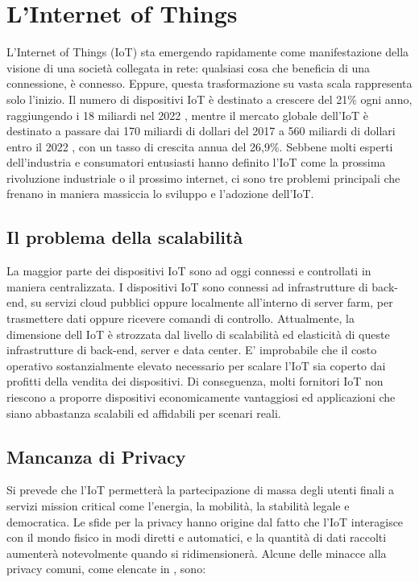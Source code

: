 \documentclass[a4paper,12pt]{article}
\begin{document}
\pagebreak

\tableofcontents

\pagebreak

\section{L'Internet of Things}
L'Internet of Things (IoT) sta emergendo rapidamente come manifestazione della visione di una società collegata in rete: qualsiasi cosa che beneficia di una connessione, è connesso. Eppure, questa trasformazione su vasta scala rappresenta solo l'inizio. Il numero di dispositivi IoT è destinato a crescere del 21\% ogni anno, raggiungendo i 18 miliardi nel 2022 \cite{c10}, mentre il mercato globale dell'IoT è destinato a passare dai 170 miliardi di dollari del 2017 a 560 miliardi di dollari entro il 2022 \cite{c15}, con un tasso di crescita annua del 26,9\%. Sebbene molti esperti dell'industria e consumatori entusiasti hanno definito l'IoT come la prossima rivoluzione industriale o il prossimo internet, ci sono tre problemi principali che frenano in maniera massiccia lo sviluppo e l'adozione dell'IoT.

\subsection{Il problema della scalabilità}
La maggior parte dei dispositivi IoT sono ad oggi connessi e controllati in maniera centralizzata. I dispositivi IoT sono connessi ad infrastrutture di back-end, su servizi cloud pubblici oppure localmente all'interno di server farm, per trasmettere dati oppure ricevere comandi di controllo.
Attualmente, la dimensione dell IoT è strozzata dal livello di scalabilità ed elasticità di queste infrastrutture di back-end, server e data center. E' improbabile che il costo operativo sostanzialmente elevato necessario per scalare l'IoT sia coperto dai profitti della vendita dei dispositivi. Di conseguenza, molti fornitori IoT non riescono a proporre dispositivi economicamente vantaggiosi ed applicazioni che siano abbastanza scalabili ed affidabili per scenari reali.

\subsection{Mancanza di Privacy}
Si prevede che l'IoT permetterà la partecipazione di massa degli utenti finali a servizi mission critical come l'energia, la  mobilità, la stabilità legale e democratica. Le sfide per la privacy hanno origine dal fatto che l'IoT interagisce con il mondo fisico in modi diretti e automatici, e la quantità di dati raccolti aumenterà notevolmente quando si ridimensionerà. Alcune  delle minacce alla privacy comuni, come elencate in \cite{c37}, sono:
\end{document}
